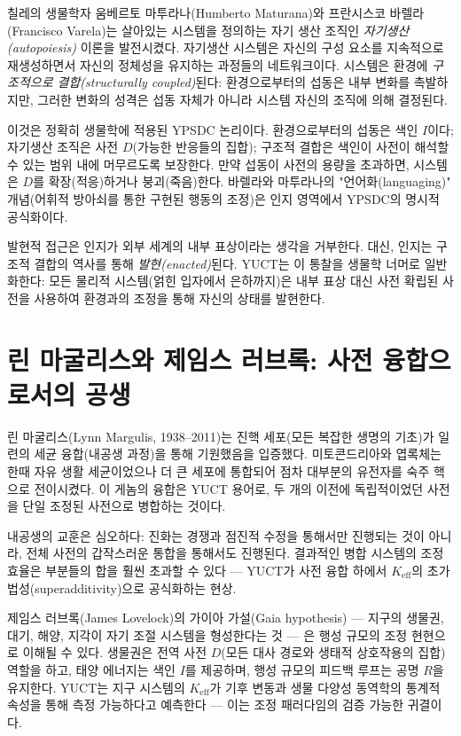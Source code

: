 \documentclass[12pt,a4paper]{article}
\begin{document}
	칠레의 생물학자 움베르토 마투라나(Humberto Maturana)와 프란시스코 바렐라(Francisco Varela)는 살아있는 시스템을 정의하는 자기 생산 조직인 \emph{자기생산(autopoiesis)} 이론을 발전시켰다. 자기생산 시스템은 자신의 구성 요소를 지속적으로 재생성하면서 자신의 정체성을 유지하는 과정들의 네트워크이다. 시스템은 환경에 \emph{구조적으로 결합(structurally coupled)}된다: 환경으로부터의 섭동은 내부 변화를 촉발하지만, 그러한 변화의 성격은 섭동 자체가 아니라 시스템 자신의 조직에 의해 결정된다.
	
	이것은 정확히 생물학에 적용된 YPSDC 논리이다. 환경으로부터의 섭동은 색인 \(I\)이다; 자기생산 조직은 사전 \(D\)(가능한 반응들의 집합); 구조적 결합은 색인이 사전이 해석할 수 있는 범위 내에 머무르도록 보장한다. 만약 섭동이 사전의 용량을 초과하면, 시스템은 \(D\)를 확장(적응)하거나 붕괴(죽음)한다. 바렐라와 마투라나의 "언어화(languaging)" 개념(어휘적 방아쇠를 통한 구현된 행동의 조정)은 인지 영역에서 YPSDC의 명시적 공식화이다.
	
	발현적 접근은 인지가 외부 세계의 내부 표상이라는 생각을 거부한다. 대신, 인지는 구조적 결합의 역사를 통해 \emph{발현(enacted)}된다. YUCT는 이 통찰을 생물학 너머로 일반화한다: 모든 물리적 시스템(얽힌 입자에서 은하까지)은 내부 표상 대신 사전 확립된 사전을 사용하여 환경과의 조정을 통해 자신의 상태를 발현한다.
	
	\section{린 마굴리스와 제임스 러브록: 사전 융합으로서의 공생}
	
	린 마굴리스(Lynn Margulis, 1938–2011)는 진핵 세포(모든 복잡한 생명의 기초)가 일련의 세균 융합(내공생 과정)을 통해 기원했음을 입증했다. 미토콘드리아와 엽록체는 한때 자유 생활 세균이었으나 더 큰 세포에 통합되어 점차 대부분의 유전자를 숙주 핵으로 전이시켰다. 이 게놈의 융합은 YUCT 용어로, 두 개의 이전에 독립적이었던 사전을 단일 조정된 사전으로 병합하는 것이다.
	
	내공생의 교훈은 심오하다: 진화는 경쟁과 점진적 수정을 통해서만 진행되는 것이 아니라, 전체 사전의 갑작스러운 통합을 통해서도 진행된다. 결과적인 병합 시스템의 조정 효율은 부분들의 합을 훨씬 초과할 수 있다 — YUCT가 사전 융합 하에서 \(K_{\mathrm{eff}}\)의 초가법성(superadditivity)으로 공식화하는 현상.
	
	제임스 러브록(James Lovelock)의 가이아 가설(Gaia hypothesis) — 지구의 생물권, 대기, 해양, 지각이 자기 조절 시스템을 형성한다는 것 — 은 행성 규모의 조정 현현으로 이해될 수 있다. 생물권은 전역 사전 \(D\)(모든 대사 경로와 생태적 상호작용의 집합) 역할을 하고, 태양 에너지는 색인 \(I\)를 제공하며, 행성 규모의 피드백 루프는 공명 \(R\)을 유지한다. YUCT는 지구 시스템의 \(K_{\mathrm{eff}}\)가 기후 변동과 생물 다양성 동역학의 통계적 속성을 통해 측정 가능하다고 예측한다 — 이는 조정 패러다임의 검증 가능한 귀결이다.
	
\end{document}
